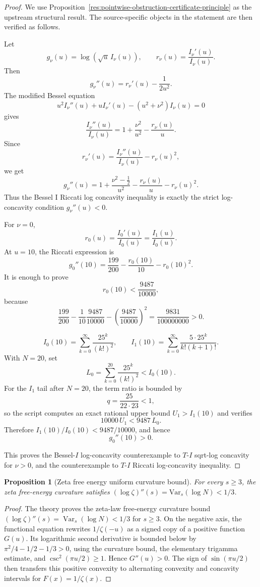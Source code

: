 \documentclass[11pt]{article}
\numberwithin{equation}{section}
\newtheorem{proposition}[theorem]{Proposition}
\theoremstyle{definition}
\theoremstyle{remark}
\newcommand{\1}{\mathbf 1}
\begin{document}
\begin{proof}
We use Proposition~\ref{res:pointwise-obstruction-certificate-principle} as the upstream structural result. The source-specific objects in the statement are then verified as follows.

Let
\[
g_\nu(u)=\log(\sqrt u\,I_\nu(u)),
\qquad
r_\nu(u)=\frac{I_\nu'(u)}{I_\nu(u)}.
\]
Then
\[
g_\nu''(u)=r_\nu'(u)-\frac{1}{2u^2}.
\]
The modified Bessel equation
\[
u^2I_\nu''(u)+uI_\nu'(u)-(u^2+\nu^2)I_\nu(u)=0
\]
gives
\[
\frac{I_\nu''(u)}{I_\nu(u)}
=1+\frac{\nu^2}{u^2}-\frac{r_\nu(u)}{u}.
\]
Since
\[
r_\nu'(u)=\frac{I_\nu''(u)}{I_\nu(u)}-r_\nu(u)^2,
\]
we get
\[
g_\nu''(u)
=
1+\frac{\nu^2-\frac12}{u^2}
-\frac{r_\nu(u)}{u}
-r_\nu(u)^2.
\]
Thus the Bessel I Riccati log concavity inequality is exactly the strict log-concavity condition \(g_\nu''(u)<0\).

For \(\nu=0\),
\[
r_0(u)=\frac{I_0'(u)}{I_0(u)}=\frac{I_1(u)}{I_0(u)}.
\]
At \(u=10\), the Riccati expression is
\[
g_0''(10)=\frac{199}{200}-\frac{r_0(10)}{10}-r_0(10)^2.
\]
It is enough to prove
\[
r_0(10)<\frac{9487}{10000},
\]
because
\[
\frac{199}{200}
-\frac{1}{10}\frac{9487}{10000}
-\left(\frac{9487}{10000}\right)^2
=\frac{9831}{100000000}>0.
\]

\[
I_0(10)=\sum_{k=0}^{\infty}\frac{25^k}{(k!)^2},
\qquad
I_1(10)=\sum_{k=0}^{\infty}\frac{5\cdot25^k}{k!(k+1)!}.
\]
With \(N=20\), set
\[
L_0=\sum_{k=0}^{20}\frac{25^k}{(k!)^2}<I_0(10).
\]
For the \(I_1\) tail after \(N=20\), the term ratio is bounded by
\[
q=\frac{25}{22\cdot23}<1,
\]
so the script computes an exact rational upper bound \(U_1>I_1(10)\) and verifies
\[
10000\,U_1<9487\,L_0.
\]
Therefore \(I_1(10)/I_0(10)<9487/10000\), and hence
\[
g_0''(10)>0.
\]

This proves the Bessel-\(I\) log-concavity counterexample to \(T\)-\(I\) sqrt-log concavity for \(\nu>0\), and the counterexample to \(T\)-\(I\) Riccati log-concavity inequality.
\end{proof}

\begin{proposition}[Zeta free energy uniform curvature bound]
\label{res:zeta-free-energy-uniform-curvature-bound}
For every \(s\ge3\), the zeta free-energy curvature satisfies \((\log\zeta)''(s)=\mathrm{Var}_s(\log N)<1/3\).
\end{proposition}

\begin{proof}
The theory proves the zeta-law free-energy curvature bound \((\log\zeta)''(s)=\operatorname{Var}_s(\log N)<1/3\) for \(s\ge3\). On the negative axis, the functional equation rewrites \(1/\zeta(-u)\) as a signed copy of a positive function \(G(u)\). Its logarithmic second derivative is bounded below by \(\pi^2/4-1/2-1/3>0\), using the curvature bound, the elementary trigamma estimate, and \(\csc^2(\pi u/2)\ge1\). Hence \(G''(u)>0\). The sign of \(\sin(\pi u/2)\) then transfers this positive convexity to alternating convexity and concavity intervals for \(F(x)=1/\zeta(x)\).
\end{proof}
\end{document}
